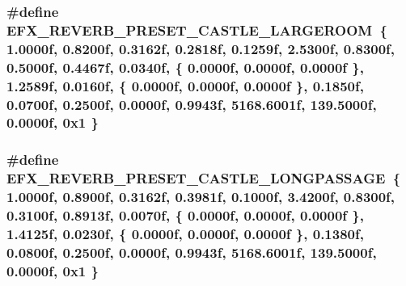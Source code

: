 \subsubsection[{\texorpdfstring{E\+F\+X\+\_\+\+R\+E\+V\+E\+R\+B\+\_\+\+P\+R\+E\+S\+E\+T\+\_\+\+C\+A\+S\+T\+L\+E\+\_\+\+L\+A\+R\+G\+E\+R\+O\+OM}{EFX_REVERB_PRESET_CASTLE_LARGEROOM}}]{\setlength{\rightskip}{0pt plus 5cm}\#define E\+F\+X\+\_\+\+R\+E\+V\+E\+R\+B\+\_\+\+P\+R\+E\+S\+E\+T\+\_\+\+C\+A\+S\+T\+L\+E\+\_\+\+L\+A\+R\+G\+E\+R\+O\+OM~\{ 1.\+0000f, 0.\+8200f, 0.\+3162f, 0.\+2818f, 0.\+1259f, 2.\+5300f, 0.\+8300f, 0.\+5000f, 0.\+4467f, 0.\+0340f, \{ 0.\+0000f, 0.\+0000f, 0.\+0000f \}, 1.\+2589f, 0.\+0160f, \{ 0.\+0000f, 0.\+0000f, 0.\+0000f \}, 0.\+1850f, 0.\+0700f, 0.\+2500f, 0.\+0000f, 0.\+9943f, 5168.\+6001f, 139.\+5000f, 0.\+0000f, 0x1 \}}\hypertarget{efx-presets_8h_a2cbeb7be51ded88e22bd3fc898c26dfe}{}\label{efx-presets_8h_a2cbeb7be51ded88e22bd3fc898c26dfe}
\subsubsection[{\texorpdfstring{E\+F\+X\+\_\+\+R\+E\+V\+E\+R\+B\+\_\+\+P\+R\+E\+S\+E\+T\+\_\+\+C\+A\+S\+T\+L\+E\+\_\+\+L\+O\+N\+G\+P\+A\+S\+S\+A\+GE}{EFX_REVERB_PRESET_CASTLE_LONGPASSAGE}}]{\setlength{\rightskip}{0pt plus 5cm}\#define E\+F\+X\+\_\+\+R\+E\+V\+E\+R\+B\+\_\+\+P\+R\+E\+S\+E\+T\+\_\+\+C\+A\+S\+T\+L\+E\+\_\+\+L\+O\+N\+G\+P\+A\+S\+S\+A\+GE~\{ 1.\+0000f, 0.\+8900f, 0.\+3162f, 0.\+3981f, 0.\+1000f, 3.\+4200f, 0.\+8300f, 0.\+3100f, 0.\+8913f, 0.\+0070f, \{ 0.\+0000f, 0.\+0000f, 0.\+0000f \}, 1.\+4125f, 0.\+0230f, \{ 0.\+0000f, 0.\+0000f, 0.\+0000f \}, 0.\+1380f, 0.\+0800f, 0.\+2500f, 0.\+0000f, 0.\+9943f, 5168.\+6001f, 139.\+5000f, 0.\+0000f, 0x1 \}}\hypertarget{efx-presets_8h_a1861da1622216f2adc3d5183456760c9}{}\label{efx-presets_8h_a1861da1622216f2adc3d5183456760c9}

